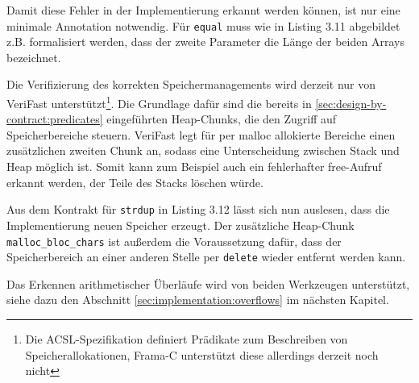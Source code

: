 Damit diese Fehler in der Implementierung erkannt werden können, ist nur eine minimale Annotation notwendig. 
Für \texttt{equal} muss wie in Listing 3.11 abgebildet z.B. formalisiert werden, dass der zweite Parameter die 
Länge der beiden Arrays bezeichnet. 



Die Verifizierung des korrekten Speichermanagements wird derzeit nur von VeriFast unterstützt\footnote{Die ACSL-Spezifikation
definiert Prädikate zum Beschreiben von Speicherallokationen, Frama-C unterstützt diese allerdings derzeit noch nicht}. Die Grundlage dafür
sind die bereits in \ref{sec:design-by-contract:predicates} eingeführten Heap-Chunks, die den Zugriff auf  
Speicherbereiche steuern.
VeriFast legt für per malloc allokierte Bereiche einen zusätzlichen zweiten Chunk an, sodass eine Unterscheidung zwischen Stack und
Heap möglich ist. Somit kann zum Beispiel auch ein fehlerhafter free-Aufruf erkannt werden, der Teile des Stacks löschen würde.



Aus dem Kontrakt für \texttt{strdup} in Listing 3.12 lässt sich nun auslesen, dass die Implementierung neuen Speicher
erzeugt. Der zusätzliche Heap-Chunk \lstinline{malloc_bloc_chars} ist außerdem die Voraussetzung dafür, dass der Speicherbereich
an einer anderen Stelle per \texttt{delete} wieder entfernt werden kann.

Das Erkennen arithmetischer Überläufe wird von beiden Werkzeugen unterstützt, siehe dazu den Abschnitt \ref{sec:implementation:overflows}
im nächsten Kapitel.



